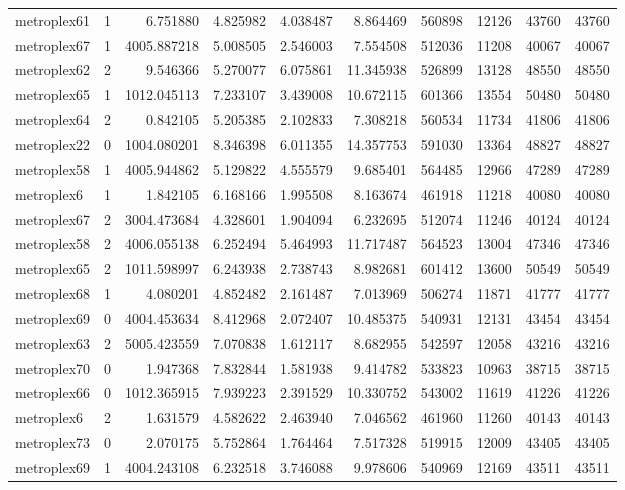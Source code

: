 \begin{longtable}{|l|r|r|r|r|r|r|r|r|r|}
metroplex61 & 1 & 6.751880 & 4.825982 & 4.038487 & 8.864469 & 560898 & 12126 & 43760 & 43760 \\
metroplex67 & 1 & 4005.887218 & 5.008505 & 2.546003 & 7.554508 & 512036 & 11208 & 40067 & 40067 \\
metroplex62 & 2 & 9.546366 & 5.270077 & 6.075861 & 11.345938 & 526899 & 13128 & 48550 & 48550 \\
metroplex65 & 1 & 1012.045113 & 7.233107 & 3.439008 & 10.672115 & 601366 & 13554 & 50480 & 50480 \\
metroplex64 & 2 & 0.842105 & 5.205385 & 2.102833 & 7.308218 & 560534 & 11734 & 41806 & 41806 \\
metroplex22 & 0 & 1004.080201 & 8.346398 & 6.011355 & 14.357753 & 591030 & 13364 & 48827 & 48827 \\
metroplex58 & 1 & 4005.944862 & 5.129822 & 4.555579 & 9.685401 & 564485 & 12966 & 47289 & 47289 \\
metroplex6 & 1 & 1.842105 & 6.168166 & 1.995508 & 8.163674 & 461918 & 11218 & 40080 & 40080 \\
metroplex67 & 2 & 3004.473684 & 4.328601 & 1.904094 & 6.232695 & 512074 & 11246 & 40124 & 40124 \\
metroplex58 & 2 & 4006.055138 & 6.252494 & 5.464993 & 11.717487 & 564523 & 13004 & 47346 & 47346 \\
metroplex65 & 2 & 1011.598997 & 6.243938 & 2.738743 & 8.982681 & 601412 & 13600 & 50549 & 50549 \\
metroplex68 & 1 & 4.080201 & 4.852482 & 2.161487 & 7.013969 & 506274 & 11871 & 41777 & 41777 \\
metroplex69 & 0 & 4004.453634 & 8.412968 & 2.072407 & 10.485375 & 540931 & 12131 & 43454 & 43454 \\
metroplex63 & 2 & 5005.423559 & 7.070838 & 1.612117 & 8.682955 & 542597 & 12058 & 43216 & 43216 \\
metroplex70 & 0 & 1.947368 & 7.832844 & 1.581938 & 9.414782 & 533823 & 10963 & 38715 & 38715 \\
metroplex66 & 0 & 1012.365915 & 7.939223 & 2.391529 & 10.330752 & 543002 & 11619 & 41226 & 41226 \\
metroplex6 & 2 & 1.631579 & 4.582622 & 2.463940 & 7.046562 & 461960 & 11260 & 40143 & 40143 \\
metroplex73 & 0 & 2.070175 & 5.752864 & 1.764464 & 7.517328 & 519915 & 12009 & 43405 & 43405 \\
metroplex69 & 1 & 4004.243108 & 6.232518 & 3.746088 & 9.978606 & 540969 & 12169 & 43511 & 43511 \\

\end{longtable}
